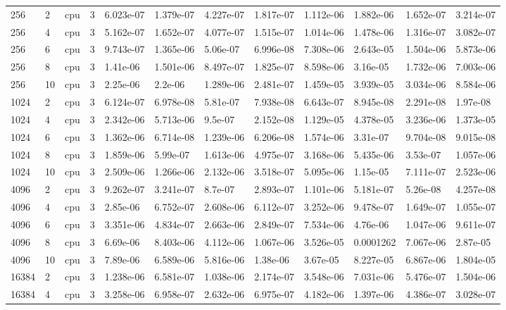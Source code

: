 \begin{tabular}{llllllllllll}
256 & 2 & cpu & 3 & 6.023e-07 & 1.379e-07 & 4.227e-07 & 1.817e-07 & 1.112e-06 & 1.882e-06 & 1.652e-07 & 3.214e-07 \\
256 & 4 & cpu & 3 & 5.162e-07 & 1.652e-07 & 4.077e-07 & 1.515e-07 & 1.014e-06 & 1.478e-06 & 1.316e-07 & 3.082e-07 \\
256 & 6 & cpu & 3 & 9.743e-07 & 1.365e-06 & 5.06e-07 & 6.996e-08 & 7.308e-06 & 2.643e-05 & 1.504e-06 & 5.873e-06 \\
256 & 8 & cpu & 3 & 1.41e-06 & 1.501e-06 & 8.497e-07 & 1.825e-07 & 8.598e-06 & 3.16e-05 & 1.732e-06 & 7.003e-06 \\
256 & 10 & cpu & 3 & 2.25e-06 & 2.2e-06 & 1.289e-06 & 2.481e-07 & 1.459e-05 & 3.939e-05 & 3.034e-06 & 8.584e-06 \\
1024 & 2 & cpu & 3 & 6.124e-07 & 6.978e-08 & 5.81e-07 & 7.938e-08 & 6.643e-07 & 8.945e-08 & 2.291e-08 & 1.97e-08 \\
1024 & 4 & cpu & 3 & 2.342e-06 & 5.713e-06 & 9.5e-07 & 2.152e-08 & 1.129e-05 & 4.378e-05 & 3.236e-06 & 1.373e-05 \\
1024 & 6 & cpu & 3 & 1.362e-06 & 6.714e-08 & 1.239e-06 & 6.206e-08 & 1.574e-06 & 3.31e-07 & 9.704e-08 & 9.015e-08 \\
1024 & 8 & cpu & 3 & 1.859e-06 & 5.99e-07 & 1.613e-06 & 4.975e-07 & 3.168e-06 & 5.435e-06 & 3.53e-07 & 1.057e-06 \\
1024 & 10 & cpu & 3 & 2.509e-06 & 1.266e-06 & 2.132e-06 & 3.518e-07 & 5.095e-06 & 1.15e-05 & 7.111e-07 & 2.523e-06 \\
4096 & 2 & cpu & 3 & 9.262e-07 & 3.241e-07 & 8.7e-07 & 2.893e-07 & 1.101e-06 & 5.181e-07 & 5.26e-08 & 4.257e-08 \\
4096 & 4 & cpu & 3 & 2.85e-06 & 6.752e-07 & 2.608e-06 & 6.112e-07 & 3.252e-06 & 9.478e-07 & 1.649e-07 & 1.055e-07 \\
4096 & 6 & cpu & 3 & 3.351e-06 & 4.834e-07 & 2.663e-06 & 2.849e-07 & 7.534e-06 & 4.76e-06 & 1.047e-06 & 9.611e-07 \\
4096 & 8 & cpu & 3 & 6.69e-06 & 8.403e-06 & 4.112e-06 & 1.067e-06 & 3.526e-05 & 0.0001262 & 7.067e-06 & 2.87e-05 \\
4096 & 10 & cpu & 3 & 7.89e-06 & 6.589e-06 & 5.816e-06 & 1.38e-06 & 3.67e-05 & 8.227e-05 & 6.867e-06 & 1.804e-05 \\
16384 & 2 & cpu & 3 & 1.238e-06 & 6.581e-07 & 1.038e-06 & 2.174e-07 & 3.548e-06 & 7.031e-06 & 5.476e-07 & 1.504e-06 \\
16384 & 4 & cpu & 3 & 3.258e-06 & 6.958e-07 & 2.632e-06 & 6.975e-07 & 4.182e-06 & 1.397e-06 & 4.386e-07 & 3.028e-07 \\

\end{tabular}
